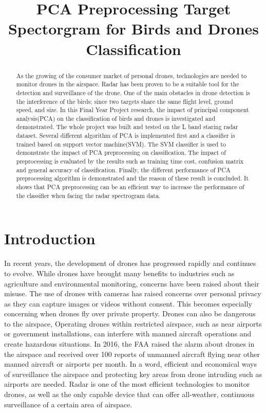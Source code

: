 \documentclass{cta-author}
\begin{document}
\title{PCA Preprocessing Target Spectorgram for Birds and Drones Classification}

\author{}

\address{
}

\begin{abstract}
As the growing of the consumer market of personal drones, technologies are needed to monitor drones in the airspace. Radar has been proven to be a suitable tool for the detection and surveillance of the drone.
One of the main obstacles in drone detection is the interference of the birds; since two targets share the same flight level, ground speed, and size.
In this Final Year Project research, the impact of principal component analysis(PCA) on the classification of birds and drones is investigated and demonstrated. The whole project was built and tested on the L band staring radar dataset. Several different algorithm of PCA is implemented first and a classifier is trained based on support vector machine(SVM). The SVM classifier is used to demonstrate the impact of PCA preprocessing on classification. The impact of preprocessing is evaluated by the results such as training time cost, confusion matrix and general accuracy of classification.
Finally, the different performance of PCA preprocessing algorithm is demonstrated and the reason of these result is concluded. It shows that PCA preprocessing can be an efficient way to increase the performance of the classifier when facing the radar spectrogram data.
\end{abstract}

\maketitle

\section{Introduction}\label{sec1}
In recent years, the development of drones has progressed rapidly and continues to evolve. While drones have brought many benefits to industries such as agriculture and environmental monitoring, concerns have been raised about their misuse. 
The use of drones with cameras has raised concerns over personal privacy as they can capture images or videos without consent. This becomes especially concerning when drones fly over private property.
Drones can also be dangerous to the airspace, Operating drones within restricted airspace, such as near airports or government installations, can interfere with manned aircraft operations and create hazardous situations. In 2016, the FAA raised the alarm about drones in the airspace and received over 100 reports of unmanned aircraft flying near other manned aircraft or airports per month.\cite{1} In a word, efficient and economical ways of surveillance the airspace and protecting key areas from drone intruding such as airports are needed. Radar is one of the most efficient technologies to monitor drones, as well as the only capable device that can offer all-weather, continuous surveillance of a certain area of airspace.
\end{document}

